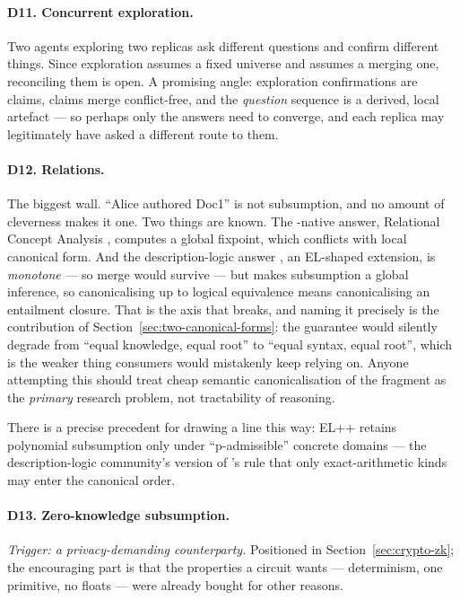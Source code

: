 \paragraph{D11. Concurrent exploration.} Two agents exploring two replicas ask
different questions and confirm different things. Since exploration assumes a
fixed universe and \odag{} assumes a merging one, reconciling them is open.
A promising angle: exploration confirmations are claims, claims merge
conflict-free, and the \emph{question} sequence is a derived, local artefact
--- so perhaps only the answers need to converge, and each replica may
legitimately have asked a different route to them.

\paragraph{D12. Relations.} The biggest wall. ``Alice authored Doc1'' is not
subsumption, and no amount of cleverness makes it one. Two things are known.
The \fca{}-native answer, Relational Concept Analysis
\citep{rouanehacene2013}, computes a global fixpoint, which conflicts with
local canonical form. And the description-logic answer \citep{baader2003}, an EL-shaped
extension, is \emph{monotone} --- so merge would survive --- but makes
subsumption a global inference, so canonicalising up to logical equivalence
means canonicalising an entailment closure. That is the axis that breaks, and
naming it precisely is the contribution of Section~\ref{sec:two-canonical-forms}:
the guarantee would silently degrade from ``equal knowledge, equal root'' to
``equal syntax, equal root'', which is the weaker thing consumers would
mistakenly keep relying on. Anyone attempting this should treat cheap semantic
canonicalisation of the fragment as the \emph{primary} research problem, not
tractability of reasoning.

There is a precise precedent for drawing a line this way: EL++ retains
polynomial subsumption only under ``p-admissible'' concrete domains
\citep{baader2005} --- the description-logic community's version of \odag{}'s
rule that only exact-arithmetic kinds may enter the canonical order.

\paragraph{D13. Zero-knowledge subsumption.} \emph{Trigger: a
privacy-demanding counterparty.} Positioned in Section~\ref{sec:crypto-zk};
the encouraging part is that the properties a circuit wants --- determinism,
one primitive, no floats --- were already bought for other reasons.

